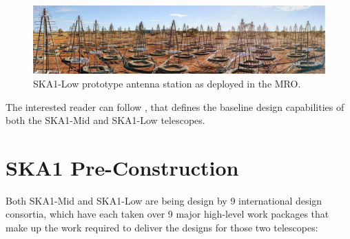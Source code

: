 \documentclass[a4paper,
               biblatex,       %
               keeplastbox,    %
               ]{jacow-2_1}    %
\begin{document}
\begin{figure}[!tb]
  \centering
    \includegraphics[width=\columnwidth]{figs/SKA1-Low_prototype_station}
  \caption{SKA1-Low prototype antenna station as deployed in the MRO.}
  \label{fig:figs_SKA1-Low_prototype_station}
\end{figure}


The interested reader can follow \cite{SKA-TEL-SKO-0000002_03}, that defines the baseline design capabilities of both the SKA1-Mid and SKA1-Low telescopes.



\section{SKA1 Pre-Construction} %
\label{sec:ska1_preconstruction}

Both SKA1-Mid and SKA1-Low are being design by 9 international design consortia, which have each taken over 9 major high-level work packages that make up the work required to deliver the designs for those two telescopes:
\end{document}
